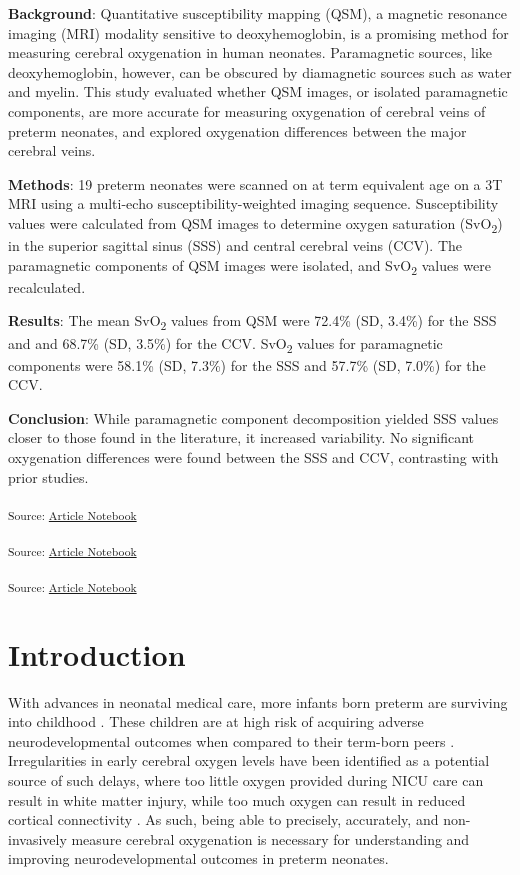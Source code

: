 \documentclass[
true
]{sn-jnl}
\begin{document}
\textbf{Background}: Quantitative susceptibility mapping (QSM), a
magnetic resonance imaging (MRI) modality sensitive to deoxyhemoglobin,
is a promising method for measuring cerebral oxygenation in human
neonates. Paramagnetic sources, like deoxyhemoglobin, however, can be
obscured by diamagnetic sources such as water and myelin. This study
evaluated whether QSM images, or isolated paramagnetic components, are
more accurate for measuring oxygenation of cerebral veins of preterm
neonates, and explored oxygenation differences between the major
cerebral veins.

\textbf{Methods}: 19 preterm neonates were scanned on at term equivalent
age on a 3T MRI using a multi-echo susceptibility-weighted imaging
sequence. Susceptibility values were calculated from QSM images to
determine oxygen saturation (SvO\textsubscript{2}) in the superior
sagittal sinus (SSS) and central cerebral veins (CCV). The paramagnetic
components of QSM images were isolated, and SvO\textsubscript{2} values
were recalculated.

\textbf{Results}: The mean SvO\textsubscript{2} values from QSM were
72.4\% (SD, 3.4\%) for the SSS and and 68.7\% (SD, 3.5\%) for the CCV.
SvO\textsubscript{2} values for paramagnetic components were 58.1\% (SD,
7.3\%) for the SSS and 57.7\% (SD, 7.0\%) for the CCV.

\textbf{Conclusion}: While paramagnetic component decomposition yielded
SSS values closer to those found in the literature, it increased
variability. No significant oxygenation differences were found between
the SSS and CCV, contrasting with prior studies.

\textsubscript{Source:
\href{https://WeberLab.github.io/Chisep_CSVO2_Manuscript/index.qmd.html}{Article
Notebook}}

\textsubscript{Source:
\href{https://WeberLab.github.io/Chisep_CSVO2_Manuscript/index.qmd.html}{Article
Notebook}}

\textsubscript{Source:
\href{https://WeberLab.github.io/Chisep_CSVO2_Manuscript/index.qmd.html}{Article
Notebook}}

\newpage{}

\section{Introduction}\label{sec-intro}

With advances in neonatal medical care, more infants born preterm are
surviving into childhood \citep{mckenzieScaffoldingParentingHealth2022}.
These children are at high risk of acquiring adverse neurodevelopmental
outcomes when compared to their term-born peers
\citep{twilhaarCognitiveOutcomesChildren2018}. Irregularities in early
cerebral oxygen levels have been identified as a potential source of
such delays, where too little oxygen provided during NICU care can
result in white matter injury, while too much oxygen can result in
reduced cortical connectivity \citep{rantakariEarlyOxygenLevels2021}. As
such, being able to precisely, accurately, and non-invasively measure
cerebral oxygenation is necessary for understanding and improving
neurodevelopmental outcomes in preterm neonates.
\end{document}
